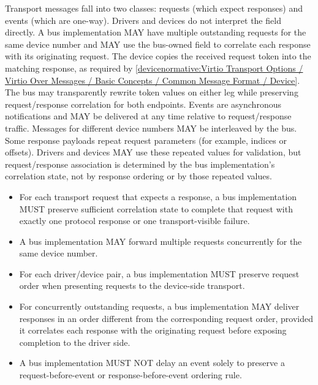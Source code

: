 Transport messages fall into two classes: requests (which expect responses) and
events (which are one-way). Drivers and devices do not interpret the
 field directly. A bus implementation MAY have multiple
outstanding requests for the same device number and MAY use the bus-owned
 field to correlate each response with its originating request.
The device copies the received request token into the matching response, as
required by
\ref{devicenormative:Virtio Transport Options / Virtio Over Messages / Basic Concepts / Common Message Format / Device}.
The bus may transparently rewrite token values on either leg while preserving
request/response correlation for both endpoints.
Events are asynchronous notifications and MAY be delivered at any time
relative to request/response traffic. Messages for different device numbers MAY
be interleaved by the bus.
Some response payloads repeat request parameters (for example, indices or
offsets). Drivers and devices MAY use these repeated values for validation,
but request/response association is determined by the bus implementation's
correlation state, not by response ordering or by those repeated values.

\begin{itemize}
  \item For each transport request that expects a response, a bus
        implementation MUST preserve sufficient correlation state to complete
        that request with exactly one protocol response or one
        transport-visible failure.
  \item A bus implementation MAY forward multiple requests concurrently for the
        same device number.
  \item For each driver/device pair, a bus implementation MUST preserve request
        order when presenting requests to the device-side transport.
  \item For concurrently outstanding requests, a bus implementation MAY deliver
        responses in an order different from the corresponding request order,
        provided it correlates each response with the originating request
        before exposing completion to the driver side.
  \item A bus implementation MUST NOT delay an event solely to preserve a
        request-before-event or response-before-event ordering rule.
\end{itemize}

